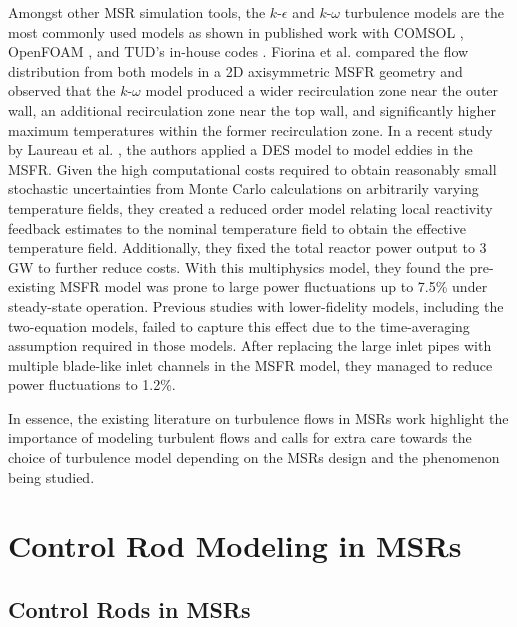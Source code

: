 Amongst other \gls{MSR} simulation tools, the $k$-$\epsilon$ and $k$-$\omega$
turbulence models are the most commonly used models as shown in published work
with COMSOL \cite{fiorina_modelling_2014}, OpenFOAM
\cite{aufiero_development_2014}, and \gls{TUD}'s in-house codes
\cite{fiorina_modelling_2014,tiberga_results_2020}. Fiorina et al.
\cite{fiorina_modelling_2014} compared the flow distribution from both models
in a 2D axisymmetric \gls{MSFR} geometry and observed that the $k$-$\omega$
model produced a wider recirculation zone near the outer wall, an additional
recirculation zone near the top wall, and significantly higher maximum
temperatures within the former recirculation zone. In a recent study by
Laureau et al. \cite{laureau_unmoderated_2022}, the authors applied a \gls{DES} model to model
eddies in the \gls{MSFR}. Given the high computational costs required to obtain reasonably small
stochastic uncertainties from Monte Carlo calculations on arbitrarily varying temperature fields,
they created a reduced order model relating local reactivity feedback estimates to the nominal
temperature field to obtain the effective temperature field. Additionally, they fixed the total
reactor power output to 3 GW to further reduce costs. With this multiphysics model, they found
the pre-existing \gls{MSFR} model was prone to large power fluctuations up to 7.5\% under
steady-state operation. Previous studies with lower-fidelity models, including the two-equation
models, failed to capture this effect due to the time-averaging assumption required in those
models. After replacing the large inlet pipes with multiple blade-like inlet channels in the
\gls{MSFR} model, they managed to reduce power fluctuations to 1.2\%.

In essence, the existing literature on turbulence flows in \glspl{MSR} work highlight
the importance of modeling turbulent flows and calls for extra care towards the choice of
turbulence model depending on the \glspl{MSR} design and the phenomenon being studied.

\section{Control Rod Modeling in MSRs}

\subsection{Control Rods in MSRs}

